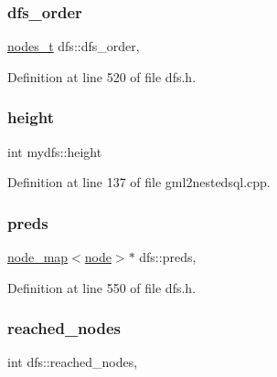 \subsubsection{\texorpdfstring{dfs\+\_\+order}{dfs\_order}}
{\footnotesize\ttfamily \mbox{\hyperlink{edge_8h_a22ac17689106ba21a84e7bc54d1199d6}{nodes\+\_\+t}} dfs\+::dfs\+\_\+order\hspace{0.3cm}{\ttfamily [protected]}, {\ttfamily [inherited]}}



Definition at line 520 of file dfs.\+h.

\mbox{\label{classmydfs_a4dfe98511fb86ff3cb365c20028cd1ae}} 
\subsubsection{\texorpdfstring{height}{height}}
{\footnotesize\ttfamily int mydfs\+::height\hspace{0.3cm}{\ttfamily [protected]}}



Definition at line 137 of file gml2nestedsql.\+cpp.

\mbox{\label{classdfs_a3fdeb5a211a1bc1753b2a637258c5355}} 
\subsubsection{\texorpdfstring{preds}{preds}}
{\footnotesize\ttfamily \mbox{\hyperlink{classnode__map}{node\+\_\+map}}$<$\mbox{\hyperlink{classnode}{node}}$>$$\ast$ dfs\+::preds\hspace{0.3cm}{\ttfamily [protected]}, {\ttfamily [inherited]}}



Definition at line 550 of file dfs.\+h.

\mbox{\label{classdfs_acb11186a1a2a2a1f38cdc0674340ba37}} 
\subsubsection{\texorpdfstring{reached\+\_\+nodes}{reached\_nodes}}
{\footnotesize\ttfamily int dfs\+::reached\+\_\+nodes\hspace{0.3cm}{\ttfamily [protected]}, {\ttfamily [inherited]}}



